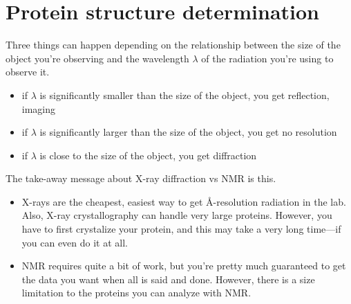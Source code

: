 \documentclass[10pt]{article}
\newenvironment{mitemize}
{
  \begin{itemize}
  \setlength{\itemsep}{1pt}
  \setlength{\parskip}{0pt}
  \setlength{\parsep}{0pt}}{\end{itemize}
}
\begin{document}
\section*{Protein structure determination}

Three things can happen depending on the relationship between the size of the object you're observing and the wavelength $\lambda$ of the radiation you're using to observe it.
\begin{mitemize}
  \item if $\lambda$ is significantly smaller than the size of the object, you get reflection, imaging
  \item if $\lambda$ is significantly larger than the size of the object, you get no resolution
  \item if $\lambda$ is close to the size of the object, you get diffraction
\end{mitemize}

The take-away message about X-ray diffraction vs NMR is this.
\begin{mitemize}
  \item X-rays are the cheapest, easiest way to get \AA-resolution radiation in the lab. Also, X-ray crystallography can handle very large proteins. However, you have to first crystalize your protein, and this may take a very long time---if you can even do it at all.
  \item NMR requires quite a bit of work, but you're pretty much guaranteed to get the data you want when all is said and done. However, there is a size limitation to the proteins you can analyze with NMR.
\end{mitemize}
\end{document}
